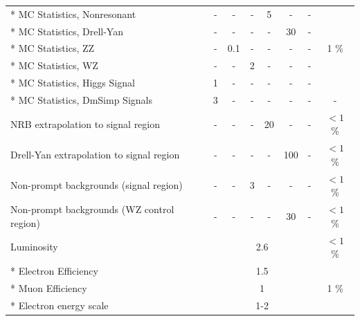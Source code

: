 \begin{table}[htb]
{\begin{tabular}{lccccccc}
\hline
* MC Statistics, Nonresonant                   & -          & -          & -          & 5           & -          & -          & \multirow{5}{*}{1 \%}  \\
* MC Statistics, Drell-Yan                     & -          & -          & -          & -           & 30         & -          &            \\
* MC Statistics, ZZ                            & -          & 0.1        & -          & -           & -          & -          &            \\
* MC Statistics, WZ                            & -          & -          & 2          & -           & -          & -          &            \\
* MC Statistics, Higgs Signal                  & 1          & -          & -          & -           & -          & -          &            \\
* MC Statistics, DmSimp Signals                & 3          & -          & -          & -           & -          & -          & -          \\
\hline
NRB extrapolation to signal region             & -          & -          & -          & 20          & -          & -          & $<1$ \%       \\
Drell-Yan extrapolation to signal region       & -          & -          & -          & -           & 100        & -          & $<1$ \%       \\
Non-prompt backgrounds (signal region)         & -          & -          & 3          & -           & -          & -          & $<1$ \%       \\
Non-prompt backgrounds (WZ control region)     & -          & -          & -          & -           & 30         & -          & $<1$ \%       \\
\hline                                                                                                                              
Luminosity                                     & \multicolumn{6}{c}{2.6}                                                      & $<1$ \%        \\
\hline
* Electron Efficiency                          & \multicolumn{6}{c}{1.5}                                                      & \multirow{9}{*}{1 \%}  \\
* Muon Efficiency                              & \multicolumn{6}{c}{1}                                                        &           \\
* Electron energy scale                        & \multicolumn{6}{c}{1-2}                                                      &           \\

\end{tabular}}
\end{table}
